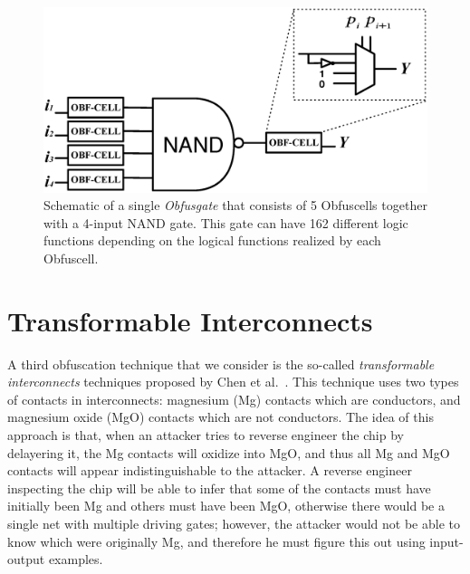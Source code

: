 \documentclass[proposal]{umassthesis}  %
\begin{document}
\begin{figure}[t] 
\begin{center}
\includegraphics[scale=0.5]{figures/obfus_cell.eps}
\caption{Schematic of a single \textit{Obfusgate} that consists of 5 Obfuscells together with a 4-input NAND gate. This gate can have 162 different logic functions depending on the logical functions realized by each Obfuscell.}
\label{fig:obfuscell}
\end{center}
\end{figure}



















\section{Transformable Interconnects}

A third obfuscation technique that we consider is the so-called \textit{transformable interconnects} techniques proposed by Chen et al.~\cite{chen-2015-dummyWire}. This technique uses two types of contacts in interconnects: magnesium (Mg) contacts which are conductors, and magnesium oxide (MgO) contacts which are not conductors. The idea of this approach is that, when an attacker tries to reverse engineer the chip by delayering it, the Mg contacts will oxidize into MgO, and thus all Mg and MgO contacts will appear indistinguishable to the attacker. A reverse engineer inspecting the chip will be able to infer that some of the contacts must have initially been Mg and others must have been MgO, otherwise there would be a single net with multiple driving gates; however, the attacker would not be able to know which were originally Mg, and therefore he must figure this out using input-output examples.
\end{document}

